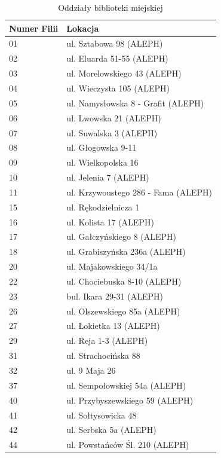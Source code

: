\documentclass{report}
\begin{document}
				\begin{longtable}{|p{2cm}|p{6cm}|}
					\caption{Oddziały biblioteki miejskiej} \label{lib_0} \\ \hline
					Numer Filii & Lokacja  \\ \hline
					01 & ul. Sztabowa 98 (ALEPH) \\ \hline
					02 & ul. Eluarda 51-55 (ALEPH)  \\ \hline
					03 & ul. Morelowskiego 43 (ALEPH)  \\ \hline
					04 & ul. Wieczysta 105 (ALEPH)  \\ \hline
					05 & ul. Namysłowska 8 - Grafit (ALEPH)  \\ \hline
					06 & ul. Lwowska 21 (ALEPH)  \\ \hline
					07 & ul. Suwalska 3 (ALEPH)  \\ \hline
					08 & ul. Głogowska 9-11  \\ \hline
					09 & ul. Wielkopolska 16  \\ \hline
					10 & ul. Jelenia 7 (ALEPH)  \\ \hline
					11 & ul. Krzywoustego 286 - Fama (ALEPH)  \\ \hline
					15 & ul. Rękodzielnicza 1  \\ \hline
					16 & ul. Kolista 17 (ALEPH)  \\ \hline
					17 & ul. Gałczyńskiego 8 (ALEPH)  \\ \hline
					18 & ul. Grabiszyńska 236a (ALEPH)  \\ \hline
					20 & ul. Majakowskiego 34/1a \\ \hline
					22 & ul. Chociebuska 8-10 (ALEPH) \\ \hline
					23 & bul. Ikara 29-31 (ALEPH) \\ \hline
					26 & ul. Olszewskiego 85a (ALEPH)  \\ \hline
					27 & ul. Łokietka 13 (ALEPH) \\ \hline
					29 & ul. Reja 1-3 (ALEPH) \\ \hline
					31 & ul. Strachocińska 88 \\ \hline
					32 & ul. 9 Maja 26 \\ \hline
					37 & ul. Sempołowskiej 54a (ALEPH) \\ \hline
					40 & ul. Przybyszewskiego 59 (ALEPH) \\ \hline
					41 & ul. Sołtysowicka 48 \\ \hline
					42 & ul. Serbska 5a (ALEPH) \\ \hline
					44 & ul. Powstańców Śl. 210 (ALEPH) \\ \hline

\end{longtable}
\end{document}
